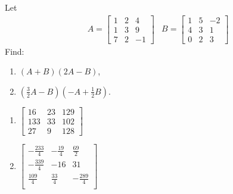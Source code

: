 \begin{Exercise}
Let 
\begin{align*}
& A =
\begin{bmatrix}
1 & 2 & 4\\
1 & 3 & 9\\
7 & 2 & -1
\end{bmatrix}
& B =
\begin{bmatrix}
1 & 5 & -2\\
4 & 3 & 1\\
0 & 2 & 3
\end{bmatrix}
\end{align*}
Find:
\begin{enumerate}[label=(\alph*)]
\item $(A+B)(2A-B)$,
\item $(\frac{3}{2}A - B)(-A + \frac{1}{2}B)$.
\end{enumerate}
\end{Exercise}
\begin{Answer}
\begin{enumerate}[label=(\alph*)]
\item $\begin{bmatrix}
16 & 23 & 129 \\
133 & 33 & 102 \\
27 & 9 & 128
\end{bmatrix}$
\item $\begin{bmatrix}
-\frac{233}{4} & -\frac{19}{4} & \frac{69}{2} \\
-\frac{339}{4} & -16 & 31 \\
\frac{109}{4} & \frac{33}{4} & -\frac{289}{4} \\
\end{bmatrix}$
\end{enumerate}
\end{Answer}

